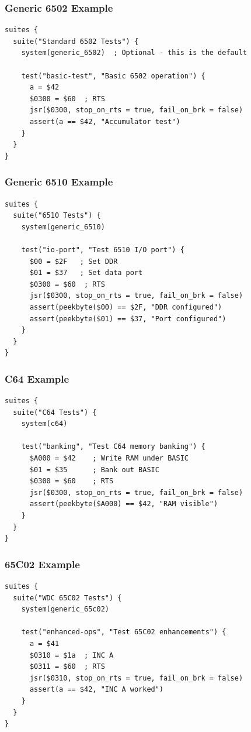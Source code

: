 \documentclass[11pt,letterpaper]{article}
\begin{document}
\subsubsection{Generic 6502 Example}

\begin{verbatim}
suites {
  suite("Standard 6502 Tests") {
    system(generic_6502)  ; Optional - this is the default

    test("basic-test", "Basic 6502 operation") {
      a = $42
      $0300 = $60  ; RTS
      jsr($0300, stop_on_rts = true, fail_on_brk = false)
      assert(a == $42, "Accumulator test")
    }
  }
}
\end{verbatim}

\subsubsection{Generic 6510 Example}

\begin{verbatim}
suites {
  suite("6510 Tests") {
    system(generic_6510)

    test("io-port", "Test 6510 I/O port") {
      $00 = $2F   ; Set DDR
      $01 = $37   ; Set data port
      $0300 = $60  ; RTS
      jsr($0300, stop_on_rts = true, fail_on_brk = false)
      assert(peekbyte($00) == $2F, "DDR configured")
      assert(peekbyte($01) == $37, "Port configured")
    }
  }
}
\end{verbatim}

\subsubsection{C64 Example}

\begin{verbatim}
suites {
  suite("C64 Tests") {
    system(c64)

    test("banking", "Test C64 memory banking") {
      $A000 = $42    ; Write RAM under BASIC
      $01 = $35      ; Bank out BASIC
      $0300 = $60    ; RTS
      jsr($0300, stop_on_rts = true, fail_on_brk = false)
      assert(peekbyte($A000) == $42, "RAM visible")
    }
  }
}
\end{verbatim}

\subsubsection{65C02 Example}

\begin{verbatim}
suites {
  suite("WDC 65C02 Tests") {
    system(generic_65c02)

    test("enhanced-ops", "Test 65C02 enhancements") {
      a = $41
      $0310 = $1a  ; INC A
      $0311 = $60  ; RTS
      jsr($0310, stop_on_rts = true, fail_on_brk = false)
      assert(a == $42, "INC A worked")
    }
  }
}
\end{verbatim}
\end{document}
